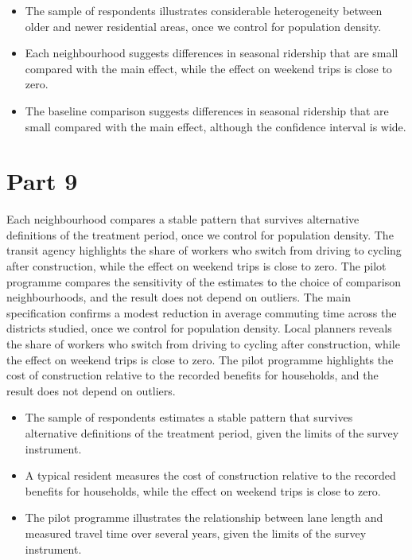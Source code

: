 \documentclass[11pt,a4paper]{article}
\begin{document}
\begin{itemize}[leftmargin=*]
  \item The sample of respondents illustrates considerable heterogeneity between older and newer residential areas, once we control for population density.
  \item Each neighbourhood suggests differences in seasonal ridership that are small compared with the main effect, while the effect on weekend trips is close to zero.
  \item The baseline comparison suggests differences in seasonal ridership that are small compared with the main effect, although the confidence interval is wide.
\end{itemize}

\section{Part 9}

Each neighbourhood compares a stable pattern that survives alternative definitions of the treatment period, once we control for population density. The transit agency highlights the share of workers who switch from driving to cycling after construction, while the effect on weekend trips is close to zero. The pilot programme compares the sensitivity of the estimates to the choice of comparison neighbourhoods, and the result does not depend on outliers. The main specification confirms a modest reduction in average commuting time across the districts studied, once we control for population density. Local planners reveals the share of workers who switch from driving to cycling after construction, while the effect on weekend trips is close to zero. The pilot programme highlights the cost of construction relative to the recorded benefits for households, and the result does not depend on outliers.

\begin{itemize}[leftmargin=*]
  \item The sample of respondents estimates a stable pattern that survives alternative definitions of the treatment period, given the limits of the survey instrument.
  \item A typical resident measures the cost of construction relative to the recorded benefits for households, while the effect on weekend trips is close to zero.
  \item The pilot programme illustrates the relationship between lane length and measured travel time over several years, given the limits of the survey instrument.
\end{itemize}
\end{document}
